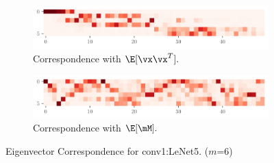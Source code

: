 \begin{figure}[H]
    \centering
    \begin{subfigure}[t]{0.5\textwidth}
        \centering
        \captionsetup{justification=centering}
        \includegraphics[width=\textwidth]{Figures/Correspondence/LeNet5_fixlr0.01/Conv/xxT_Trueest_real_corr_expand_t50_CIFAR10_Exp1_LeNet5_fixlr0.01_E-1_conv1.pdf}
        \caption{Correspondence with $\E[\vx\vx^T].$}
        \label{fig:Corr_xxT_True_conv1}
    \end{subfigure}%
    \begin{subfigure}[t]{0.5\textwidth}
        \centering
        \captionsetup{justification=centering}
        \includegraphics[width=\textwidth]{Figures/Correspondence/LeNet5_fixlr0.01/Conv/UTAU_Trueest_real_corr_expand_t50_CIFAR10_Exp1_LeNet5_fixlr0.01_E-1_conv1.pdf}
        \caption{Correspondence with $\E[\mM].$}
        \label{fig:Corr_UTAU_True_conv1}
    \end{subfigure}
    \caption{Eigenvector Correspondence for conv1:LeNet5. ($m$=6)}
    \label{fig:Corr_conv1}
\end{figure}

